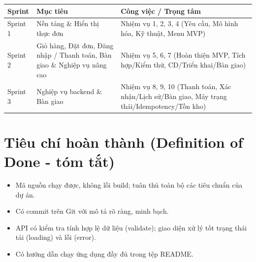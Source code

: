 \documentclass[12pt, a4paper]{article}
\begin{document}
\begin{longtable}{p{3cm} p{3.5cm} p{4.5cm}}
\toprule
\textbf{Sprint} & \textbf{Mục tiêu} & \textbf{Công việc / Trọng tâm} \\
\midrule
Sprint 1 & Nền tảng \& Hiển thị thực đơn & Nhiệm vụ 1, 2, 3, 4 (Yêu cầu, Mô hình hóa, Kỹ thuật, Menu MVP) \\
Sprint 2 & Giỏ hàng, Đặt đơn, Đăng nhập / Thanh toán, Bàn giao \& Nghiệp vụ nâng cao & Nhiệm vụ 5, 6, 7 (Hoàn thiện MVP, Tích hợp/Kiểm thử, CD/Triển khai/Bàn giao) \\
Sprint 3 & Nghiệp vụ backend \& Bàn giao & Nhiệm vụ 8, 9, 10 (Thanh toán, Xác nhận/Lịch sử/Bàn giao, Máy trạng thái/Idempotency/Tồn kho) \\
\bottomrule
\end{longtable}

\section{Tiêu chí hoàn thành (Definition of Done - tóm tắt)}
\begin{itemize}
  \item Mã nguồn chạy được, không lỗi build; tuân thủ toàn bộ các tiêu chuẩn của dự án.
  \item Có commit trên Git với mô tả rõ ràng, minh bạch.
  \item API có kiểm tra tính hợp lệ dữ liệu (validate); giao diện xử lý tốt trạng thái tải (loading) và lỗi (error).
  \item Có hướng dẫn chạy ứng dụng đầy đủ trong tệp README.
\end{itemize}
\end{document}
